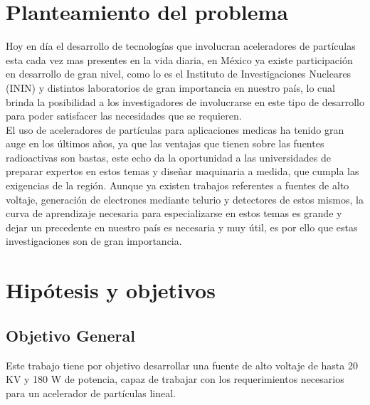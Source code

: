 
\section{Planteamiento del problema}
Hoy en día el desarrollo de tecnologías que involucran aceleradores de partículas esta cada vez mas presentes en la vida diaria, en México ya existe participación en desarrollo de gran nivel, como lo es el Instituto de Investigaciones Nucleares (ININ) y distintos laboratorios de gran importancia en nuestro país, lo cual brinda la posibilidad a los investigadores
de involucrarse en este tipo de desarrollo para poder satisfacer las necesidades
que se requieren.\\

El uso de aceleradores de partículas para aplicaciones medicas ha tenido gran auge en los últimos años, ya que las ventajas que tienen sobre las fuentes radioactivas son bastas, este echo da la oportunidad a las universidades de preparar expertos en estos temas y diseñar maquinaria a medida, que cumpla las exigencias de la región. Aunque ya existen trabajos referentes a fuentes de alto voltaje, generación de electrones mediante telurio y detectores de estos mismos, la curva de aprendizaje necesaria para especializarse en estos temas es grande y dejar un precedente en nuestro país es necesaria y muy útil, es por ello que estas
investigaciones son de gran importancia.
\section{Hipótesis y objetivos}

\subsection{Objetivo General}

Este trabajo tiene por objetivo desarrollar una fuente de alto voltaje de hasta 20 KV y 180 W de potencia, capaz de trabajar con los requerimientos necesarios para un acelerador de partículas lineal.

